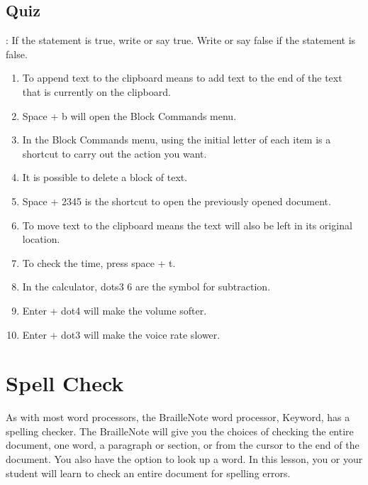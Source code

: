 \documentclass[10pt,letterpaper,twoside]{report}
\begin{document}
\subsection{Quiz}:
If the statement is true, write or say true. Write or say false if the statement is false.
\begin{enumerate}
	\item To append text to the clipboard means to add text to the end of the text that is currently on the clipboard.
	\item Space + b will open the Block Commands menu.
	\item In the Block Commands menu, using the initial letter of each item is a shortcut to carry out the action you want.
	\item It is possible to delete a block of text.
	\item Space + 2345 is the shortcut to open the previously opened document.
	\item To move text to the clipboard means the text will also be left in its original location.
	\item To check the time, press space + t.
	\item In the calculator, dots3 6 are the symbol for subtraction.
	\item Enter + dot4 will make the volume softer.
	\item Enter + dot3 will make the voice rate slower.
\end{enumerate}
\clearpage
\section{Spell Check}
As with most word processors, the BrailleNote word processor, Keyword, has a spelling checker. The BrailleNote will give you the choices of checking the entire document, one word, a paragraph or section, or from the cursor to the end of the document. You also have the option to look up a word. In this lesson, you or your student will learn to check an entire document for spelling errors.
\end{document}
